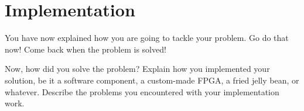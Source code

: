 \chapter{Implementation}
\label{chapter:implementation}

You have now explained how you are going to tackle your problem. 
Go do that now! Come back when the problem is solved!

Now, how did you solve the problem? 
Explain how you implemented your solution, be it a software component, a
custom-made FPGA, a fried jelly bean, or whatever.
Describe the problems you encountered with your implementation work.

